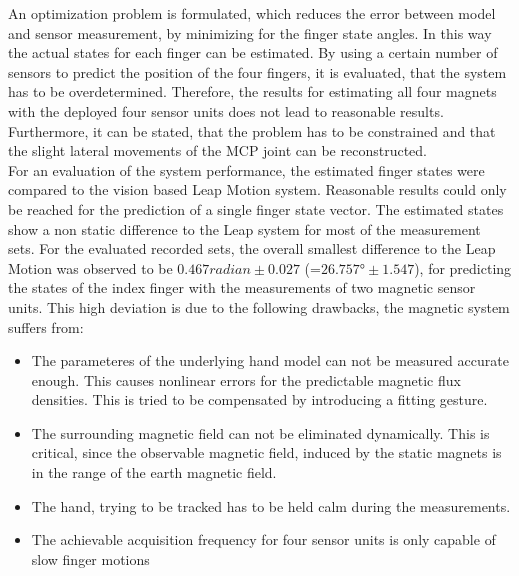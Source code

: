 An optimization problem is formulated, which reduces the error between model and sensor measurement, by minimizing for the finger state angles. In this way the actual states for each finger can be estimated. By using a certain number of sensors to predict the position of the four fingers, it is evaluated, that the system has to be overdetermined. Therefore, the results for estimating all four magnets with the deployed four sensor units does not lead to reasonable results. Furthermore, it can be stated, that the problem has to be constrained and that the slight lateral movements of the \ac{MCP} joint can be reconstructed.\\
For an evaluation of the system performance, the estimated finger states were compared to the vision based Leap Motion system. Reasonable results could only be reached for the prediction of a single finger state vector. The estimated states show a non static difference to the Leap system for most of the measurement sets. 
For the evaluated recorded sets, the overall smallest difference to the Leap Motion was observed to be $ 0.467 \si{radian} \pm 0.027 $ (=$ 26.757 \si{\degree} \pm 1.547 $), for predicting the states of the index finger with the measurements of two magnetic sensor units. This high deviation is due to the following drawbacks, the magnetic system suffers from:
\begin{itemize}
\item The parameteres of the underlying hand model can not be measured accurate enough. This causes nonlinear errors for the predictable magnetic flux densities. This is tried to be compensated by introducing a fitting gesture.
\item The surrounding magnetic field can not be eliminated dynamically. This is critical, since the observable magnetic field, induced by the static magnets is in the range of the earth magnetic field.
\item The hand, trying to be tracked has to be held calm during the measurements.
\item The achievable acquisition frequency for four sensor units is only capable of slow finger motions
\end{itemize} 

